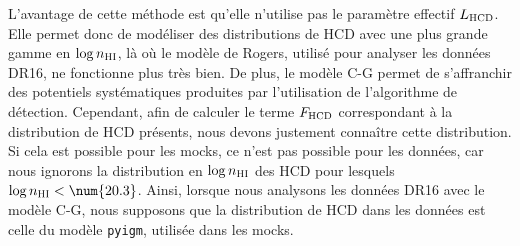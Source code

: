 L'avantage de cette méthode est qu'elle n'utilise pas le paramètre effectif $L_{\textsc{HCD}}$. Elle permet donc de modéliser des distributions de HCD avec une plus grande gamme en $\log n_{\textsc{HI}}$, là où le modèle de Rogers, utilisé pour analyser les données DR16, ne fonctionne plus très bien.
De plus, le modèle C-G permet de s'affranchir des potentiels systématiques produites par l'utilisation de l'algorithme de détection.
Cependant, afin de calculer le terme $F_{\textsc{HCD}}$ correspondant à la distribution de HCD présents, nous devons justement connaître cette distribution. Si cela est possible pour les mocks, ce n'est pas possible pour les données, car nous ignorons la distribution en $\log n_{\textsc{HI}}$ des HCD pour lesquels $\log n_{\textsc{HI}} < \num{20.3}$.
Ainsi, lorsque nous analysons les données DR16 avec le modèle C-G, nous supposons que la distribution de HCD dans les données est celle du modèle \texttt{pyigm}, utilisée dans les mocks. %

